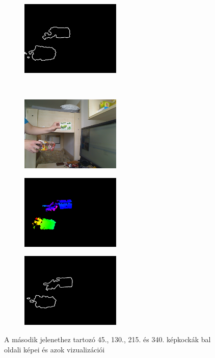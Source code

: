 \begin{figure}[b!]
\begin{subfigure}[b]{.32\linewidth}
  \end{subfigure}
\begin{subfigure}[b]{.32\linewidth}
	\centering
	\includegraphics[width=135pt]{figures/scene2/ctr_215.png}
  \end{subfigure}\\\vspace{5pt}
  \begin{subfigure}[b]{.32\linewidth}
	\centering
	\includegraphics[width=135pt]{figures/scene2/left_339.png}
  \end{subfigure}
\begin{subfigure}[b]{.32\linewidth}
	\centering
	\includegraphics[width=135pt]{figures/scene2/vis_339.png}
  \end{subfigure}
\begin{subfigure}[b]{.32\linewidth}
	\centering
	\includegraphics[width=135pt]{figures/scene2/ctr_339.png}
  \end{subfigure}
\caption{A második jelenethez tartozó 45., 130., 215. és 340. képkockák bal oldali képei és azok vizualizációi \label{fig:scene2_frames}}

\end{figure}

